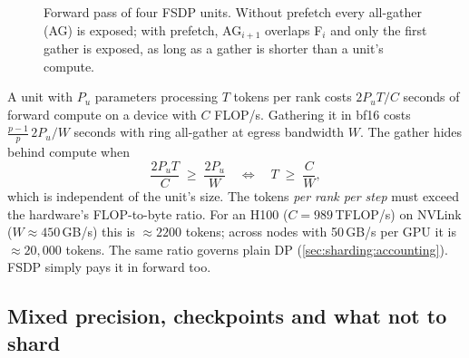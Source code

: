 \begin{figure}[t]
\centering
{}
\caption{Forward pass of four FSDP units. Without prefetch every all-gather (AG) is exposed;
with prefetch, AG$_{i+1}$ overlaps F$_i$ and only the first gather is exposed, as long as a
gather is shorter than a unit's compute.}
\label{fig:sharding:prefetch}
\end{figure}

\begin{systemslens}
A unit with $P_u$ parameters processing $T$ tokens per rank costs $2P_uT/C$ seconds of forward
compute on a device with $C$ FLOP/s. Gathering it in bf16 costs $\frac{p-1}{p}\,2P_u/W$
seconds with ring all-gather at egress bandwidth $W$. The gather hides behind compute when
\[
  \frac{2P_u T}{C} \;\ge\; \frac{2P_u}{W}\quad\Longleftrightarrow\quad T \;\ge\; \frac{C}{W},
\]
which is independent of the unit's size. The tokens \emph{per rank per step} must exceed the
hardware's FLOP-to-byte ratio. For an H100 ($C=989$\,TFLOP/s) on NVLink ($W\approx450$\,GB/s)
this is $\approx2200$ tokens; across nodes with 50\,GB/s per GPU it is $\approx20{,}000$ tokens.
The same ratio governs plain DP (\cref{sec:sharding:accounting}). FSDP simply pays it in forward
too.
\end{systemslens}

\subsection{Mixed precision, checkpoints and what not to shard}

